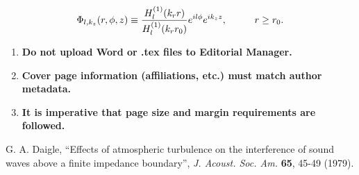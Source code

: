 \documentclass[12pt,letter]{article}
\begin{document}
\begin{equation}
	\Phi_{l,k_z}(r,\phi,z) \equiv \frac{H_l^{(1)}(k_rr)}{H_l^{(1)}(k_rr_0)} e^{il\phi}e^{ik_zz}, \hspace{10mm} r\ge r_0.
\end{equation}


\begin{enumerate}
	\item \textbf{Do not upload Word or .tex files to Editorial Manager.}
	\item \textbf{Cover page information (affiliations, etc.) must match author metadata.}
	\item \textbf{It is imperative that page size and margin requirements are followed.}
\end{enumerate}




\begin{thebibliography}{9}

	G. A. Daigle, ``Effects of atmospheric turbulence on the interference of sound waves above a finite impedance boundary'', \textsl{J. Acoust. Soc. Am.} \textbf{65}, 45-49 (1979).

\end{thebibliography}
\end{document}
